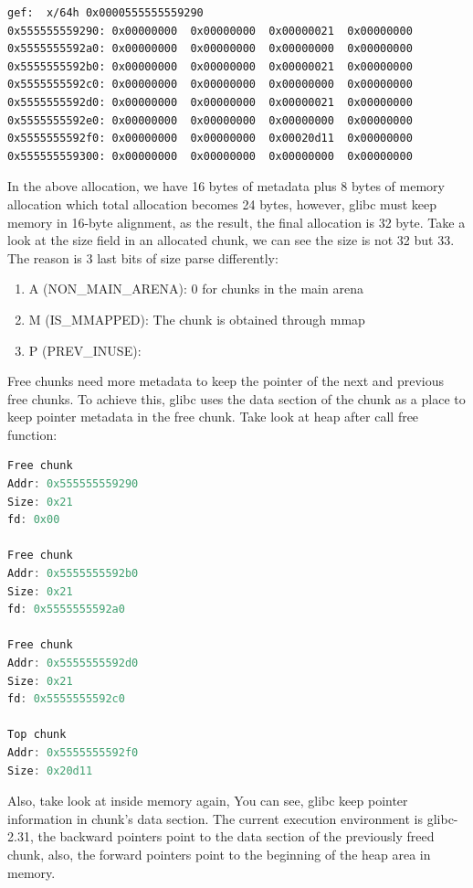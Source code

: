 \documentclass{masterthesis}
\newcommand*\libc{glibc}
\newcommand{\glnote}[1]{\todo[color=yellow!20]{#1}}
\begin{document}
\begin{lstlisting}[frame=tlrb]
gef:  x/64h 0x0000555555559290
0x555555559290:	0x00000000	0x00000000	0x00000021	0x00000000
0x5555555592a0:	0x00000000	0x00000000	0x00000000	0x00000000
0x5555555592b0:	0x00000000	0x00000000	0x00000021	0x00000000
0x5555555592c0:	0x00000000	0x00000000	0x00000000	0x00000000
0x5555555592d0:	0x00000000	0x00000000	0x00000021	0x00000000
0x5555555592e0:	0x00000000	0x00000000	0x00000000	0x00000000
0x5555555592f0:	0x00000000	0x00000000	0x00020d11	0x00000000
0x555555559300:	0x00000000	0x00000000	0x00000000	0x00000000
\end{lstlisting}

In the above allocation, we have 16 bytes of metadata plus 8 bytes of memory allocation which total allocation becomes 24 bytes, however, \libc{} must keep memory in 16-byte alignment, as the result, the final allocation is 32 byte. Take a look at the size field in an allocated chunk, we can see the size is not 32 but 33. The reason is 3 last bits of size parse differently:\glnote{non-main-arena and prev-in-use seem swapped}
\begin{enumerate}
	\item A (NON\_MAIN\_ARENA): 0 for chunks in the main arena
	\item M (IS\_MMAPPED): The chunk is obtained through mmap
	\item P (PREV\_INUSE): 
\end{enumerate}
Free chunks need more metadata to keep the pointer of the next and previous free chunks. To achieve this, \libc{} uses the data section of the chunk as a place to keep pointer metadata in the free chunk. Take look at heap after call free function:

\begin{lstlisting}[language=c,frame=tlrb]
Free chunk 
Addr: 0x555555559290
Size: 0x21
fd: 0x00

Free chunk
Addr: 0x5555555592b0
Size: 0x21
fd: 0x5555555592a0

Free chunk 
Addr: 0x5555555592d0
Size: 0x21
fd: 0x5555555592c0

Top chunk
Addr: 0x5555555592f0
Size: 0x20d11
\end{lstlisting}

Also, take look at inside memory again, You can see, \libc{} keep pointer information in chunk's data section. The current execution environment is \libc{-2.31}, the backward pointers point to the data section of the previously freed chunk, also, the forward pointers point to the beginning of the heap area in memory.
\end{document}
